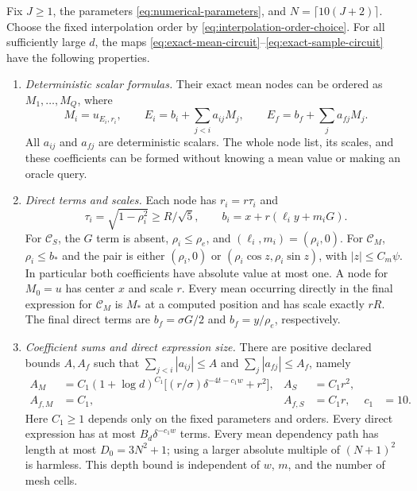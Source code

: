 \begin{theorem}
\label{thm:numerical-interface}\label{lem:compiler-circuit}
Fix $J\ge1$, the parameters \eqref{eq:numerical-parameters}, and
$N=\lceil10(J+2)\rceil$.  Choose the fixed interpolation order by
\eqref{eq:interpolation-order-choice}.  For all sufficiently large $d$,
the maps \eqref{eq:exact-mean-circuit}--\eqref{eq:exact-sample-circuit}
have the following properties.

\begin{enumerate}[label=(\roman*),leftmargin=*]
\item \emph{Deterministic scalar formulas.}
Their exact mean nodes can be ordered as $M_1,\ldots,M_Q$, where
\begin{equation}\label{eq:exact-affine-centers}
 M_i=u_{E_i,r_i},\qquad
 E_i=b_i+\sum_{j<i}a_{ij}M_j,\qquad
 E_f=b_f+\sum_ja_{fj}M_j.
\end{equation}
All $a_{ij}$ and $a_{fj}$ are deterministic scalars.  The whole node
list, its scales, and these coefficients can be formed without
knowing a mean value or making an oracle query.

\item \emph{Direct terms and scales.}
Each node has $r_i=r\tau_i$ and
\[
 \tau_i=\sqrt{1-\rho_i^2}\ge R/\sqrt5,\qquad
 b_i=x+r(\ell_i y+m_iG).
\]
For $\mathcal C_S$, the $G$ term is absent,
$\rho_i\le\rho_e$, and $(\ell_i,m_i)=(\rho_i,0)$.
For $\mathcal C_M$, $\rho_i\le b_*$ and the pair is either
$(\rho_i,0)$ or $(\rho_i\cos z,\rho_i\sin z)$, with
$|z|\le C_m\psi$.  In particular both coefficients have absolute
value at most one.  A node for $M_0=u$ has center $x$ and scale $r$.
Every mean occurring directly in the final expression for
$\mathcal C_M$ is $M_*$ at a computed position and has scale exactly
$rR$.  The final direct terms are
$b_f=\sigma G/2$ and $b_f=y/\rho_e$, respectively.

\item \emph{Coefficient sums and direct expression size.}
There are positive declared bounds $A,A_f$ such that
$\sum_{j<i}|a_{ij}|\le A$ and $\sum_j|a_{fj}|\le A_f$, namely
\begin{equation}\label{eq:coefficient-bounds}
 \begin{aligned}
 A_M&=C_1(1+\log d)^{C_1}
       \bigl[(r/\sigma)\delta^{-4t-c_1w}+r^2\bigr],
 & A_S&=C_1r^2,\\
 A_{f,M}&=C_1,
 & A_{f,S}&=C_1r,
 &c_1&=10.
 \end{aligned}
\end{equation}
Here $C_1\ge1$ depends only on the fixed parameters and orders.
Every direct expression has at most $B_d\delta^{-c_1w}$ terms.
Every mean dependency path has length at most
$D_0=3N^2+1$; using a larger absolute multiple of $(N+1)^2$ is harmless.
This depth bound is independent of $w$, $m$, and the number of mesh cells.


\end{enumerate}
\end{theorem}
